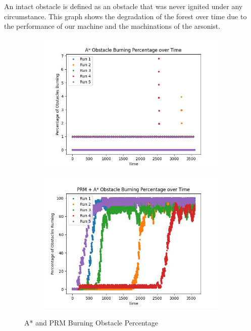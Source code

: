 \documentclass{article}
\begin{document}
An intact obstacle is defined as an obstacle that was never ignited under any circumstance. This graph shows the degradation of the forest over time due to the performance of our machine and the machinations of the arsonist.

\begin{figure}[H]
    \centering
    \begin{subfigure}{0.4\textwidth}
        \centering
        \includegraphics[width = \textwidth]{imgs/astar_obstacles_burning.jpg}
    \end{subfigure}
    \begin{subfigure}{0.4\textwidth}
        \centering
        \includegraphics[width = \textwidth]{imgs/prm_obstacles_burning.jpg}
    \end{subfigure}
    \caption{A* and PRM Burning Obstacle Percentage}
    \label{fig:intact}
\end{figure}
\end{document}
